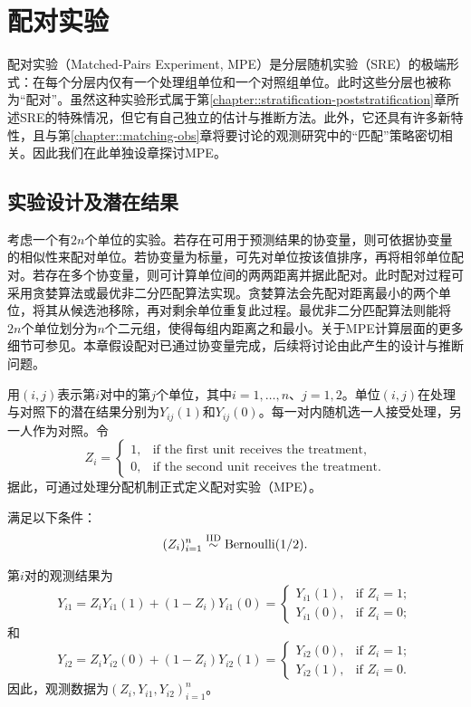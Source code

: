 
\chapter{配对实验}
 \label{chapter::mpe}
 
配对实验（Matched-Pairs Experiment, MPE）是分层随机实验（SRE）的极端形式：在每个分层内仅有一个处理组单位和一个对照组单位。此时这些分层也被称为“配对”。虽然这种实验形式属于第\ref{chapter::stratification-poststratification}章所述SRE的特殊情况，但它有自己独立的估计与推断方法。此外，它还具有许多新特性，且与第\ref{chapter::matching-obs}章将要讨论的观测研究中的“匹配”策略密切相关。因此我们在此单独设章探讨MPE。





\section{实验设计及潜在结果}
 
考虑一个有$2n$个单位的实验。若存在可用于预测结果的协变量，则可依据协变量的相似性来配对单位。若协变量为标量，可先对单位按该值排序，再将相邻单位配对。若存在多个协变量，则可计算单位间的两两距离并据此配对。此时配对过程可采用贪婪算法或最优非二分匹配算法实现。贪婪算法会先配对距离最小的两个单位，将其从候选池移除，再对剩余单位重复此过程。最优非二分匹配算法则能将$2n$个单位划分为$n$个二元组，使得每组内距离之和最小。关于MPE计算层面的更多细节可参见\citet{greevy2004optimal}。本章假设配对已通过协变量完成，后续将讨论由此产生的设计与推断问题。 


 用$(i,j)$表示第$i$对中的第$j$个单位，其中$i=1,\ldots, n$、$j=1,2$。单位$(i, j)$在处理与对照下的潜在结果分别为$Y_{ij}(1)$和$Y_{ij}(0)$。每一对内随机选一人接受处理，另一人作为对照。令
$$
Z_i = \begin{cases}
   1,& \text{if the first unit receives the treatment}, \\
   0, & \text{if the second unit receives the treatment}. 
\end{cases}  
$$
据此，可通过处理分配机制正式定义配对实验（MPE）。 


\begin{definition}
[MPE]
满足以下条件：  
\begin{eqnarray}
 (Z_i)_{i=1}^n \stackrel{\textup{IID}}{\sim} \text{Bernoulli}(1/2).
 \label{eq::mp-treatment}
\end{eqnarray} 
\end{definition}

 
 
第$i$对的观测结果为
$$
Y_{i1} = Z_i Y_{i1}(1) + (1-Z_i) Y_{i1}(0)
= \begin{cases}
   Y_{i1}(1),& \text{if } Z_i = 1; \\
   Y_{i1}(0), & \text{if } Z_i = 0; 
\end{cases}
$$
和
$$
Y_{i2} = Z_i Y_{i2}(0) + (1-Z_i) Y_{i2}(1)
= \begin{cases}
   Y_{i2}(0),& \text{if } Z_i = 1; \\
   Y_{i2}(1), & \text{if } Z_i = 0 . 
\end{cases} 
$$
因此，观测数据为$( Z_i, Y_{i1} , Y_{i2} )_{i=1}^n$。  
 
